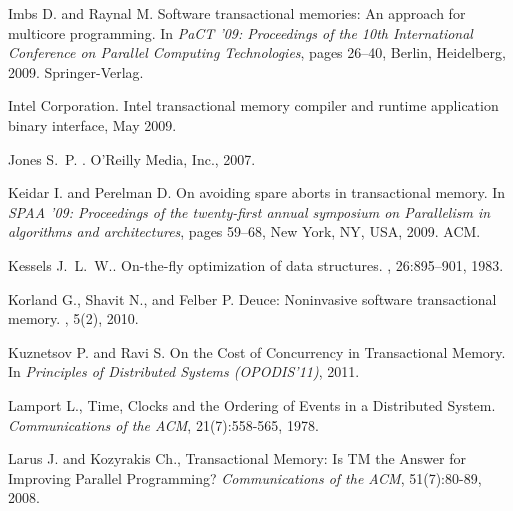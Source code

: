 \begin{thebibliography}{99}
{
Imbs D. and Raynal M.
\newblock Software transactional memories: An approach for multicore
  programming.
\newblock In {\em PaCT '09: Proceedings of the 10th International Conference on
  Parallel Computing Technologies}, pages 26--40, Berlin, Heidelberg, 2009.
  Springer-Verlag.



{Intel Corporation}.
\newblock Intel transactional memory compiler and runtime application binary
  interface, May 2009.



Jones S.~P.
.
\newblock O'Reilly Media, Inc., 2007.





Keidar I. and Perelman D.
\newblock On avoiding spare aborts in transactional memory.
\newblock In {\em SPAA '09: Proceedings of the twenty-first annual symposium on
  Parallelism in algorithms and architectures}, pages 59--68, New York, NY,
  USA, 2009. ACM.


Kessels J.~L.~W..
\newblock On-the-fly optimization of data structures.
, 26:895--901, 1983.






Korland G., Shavit N., and Felber P.
\newblock Deuce: Noninvasive software transactional memory.
, 5(2), 2010.



Kuznetsov P. and Ravi S.
\newblock On the Cost of Concurrency in Transactional Memory.
\newblock In {\em Principles of Distributed Systems (OPODIS'11)}, 2011.




Lamport L., 
Time, Clocks and the Ordering of Events in a Distributed System.
{\em Communications  of the ACM}, 21(7):558-565, 1978.



Larus J. and Kozyrakis Ch., 
Transactional Memory: Is TM the Answer for Improving Parallel Programming?
{\it Communications of the ACM}, 51(7):80-89, 2008. 

}
\end{thebibliography}
